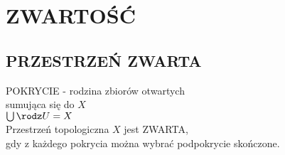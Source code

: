 \section{ZWARTOŚĆ}

\subsection{PRZESTRZEŃ ZWARTA}
\begin{center}\large
    {\color{def}POKRYCIE} - rodzina zbiorów otwartych \\sumująca się do $X$\smallskip\\
    $\bigcup \rodz U = X$\bigskip\\
    Przestrzeń topologiczna $X$ jest {\color{def}ZWARTA}, \\gdy z każdego pokrycia można wybrać podpokrycie skończone.
\end{center}\bigskip

